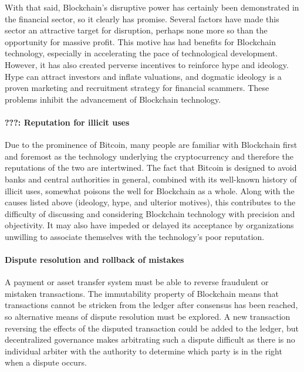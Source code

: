 {With that said, Blockchain's disruptive power has certainly been demonstrated in the financial sector, so it clearly has promise. Several factors have made this sector an attractive target for disruption, perhaps none more so than the opportunity for massive profit. This motive has had benefits for Blockchain technology, especially in accelerating the pace of technological development. However, it has also created perverse incentives to reinforce hype and ideology. Hype can attract investors and inflate valuations, and dogmatic ideology is a proven marketing and recruitment strategy for financial scammers. These problems inhibit the advancement of Blockchain technology.

\paragraph{???: Reputation for illicit uses}
Due to the prominence of Bitcoin, many people are familiar with Blockchain first and foremost as the technology underlying the cryptocurrency and therefore the reputations of the two are intertwined. The fact that Bitcoin is designed to avoid banks and central authorities in general, combined with its well-known history of illicit uses, somewhat poisons the well for Blockchain as a whole. Along with the causes listed above (ideology, hype, and ulterior motives), this contributes to the difficulty of discussing and considering Blockchain technology with precision and objectivity. It may also have impeded or delayed its acceptance by organizations unwilling to associate themselves with the technology's poor reputation.

\paragraph{Dispute resolution and rollback of mistakes}
A payment or asset transfer system must be able to reverse fraudulent or mistaken transactions. The immutability property of Blockchain means that transactions cannot be stricken from the ledger after consensus has been reached, so alternative means of dispute resolution must be explored. A new transaction reversing the effects of the disputed transaction could be added to the ledger, but decentralized governance makes arbitrating such a dispute difficult as there is no individual arbiter with the authority to determine which party is in the right when a dispute occurs. 

}
